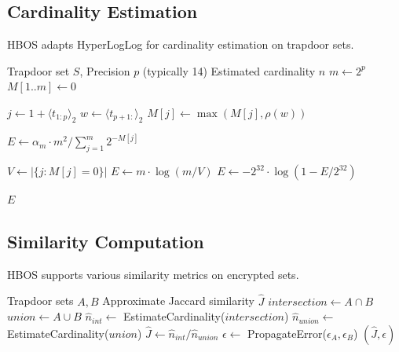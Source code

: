 \documentclass[../main_comprehensive.tex]{subfiles}
\begin{document}
\subsection{Cardinality Estimation}

HBOS adapts HyperLogLog for cardinality estimation on trapdoor sets.

\begin{algorithm}
\caption{HyperLogLog Cardinality Estimation}
\label{alg:hyperloglog}
\begin{algorithmic}[1]
\REQUIRE Trapdoor set $S$, Precision $p$ (typically 14)
\ENSURE Estimated cardinality $\hat{n}$
\STATE $m \leftarrow 2^p$ 
\STATE $M[1..m] \leftarrow 0$ 

  \STATE $j \leftarrow 1 + \langle t_{1:p} \rangle_2$ 
  \STATE $w \leftarrow \langle t_{p+1:} \rangle_2$ 
  \STATE $M[j] \leftarrow \max(M[j], \rho(w))$ 
\ENDFOR

\STATE $E \leftarrow \alpha_m \cdot m^2 / \sum_{j=1}^{m} 2^{-M[j]}$ 

 
  \STATE $V \leftarrow |\{j : M[j] = 0\}|$
    \STATE $E \leftarrow m \cdot \log(m/V)$ 
  \ENDIF
{} 
  \STATE $E \leftarrow -2^{32} \cdot \log(1 - E/2^{32})$
\ENDIF

\RETURN $E$
\end{algorithmic}
\end{algorithm}

\subsection{Similarity Computation}

HBOS supports various similarity metrics on encrypted sets.

\begin{algorithm}
\caption{Jaccard Similarity}
\label{alg:jaccard}
\begin{algorithmic}[1]
\REQUIRE Trapdoor sets $A, B$
\ENSURE Approximate Jaccard similarity $\hat{J}$
\STATE $intersection \leftarrow A \cap B$
\STATE $union \leftarrow A \cup B$
\STATE $\hat{n}_{int} \leftarrow$ EstimateCardinality($intersection$)
\STATE $\hat{n}_{union} \leftarrow$ EstimateCardinality($union$)
\STATE $\hat{J} \leftarrow \hat{n}_{int} / \hat{n}_{union}$
\STATE $\epsilon \leftarrow$ PropagateError($\epsilon_A, \epsilon_B$)
\RETURN $(\hat{J}, \epsilon)$
\end{algorithmic}
\end{algorithm}
\end{document}
